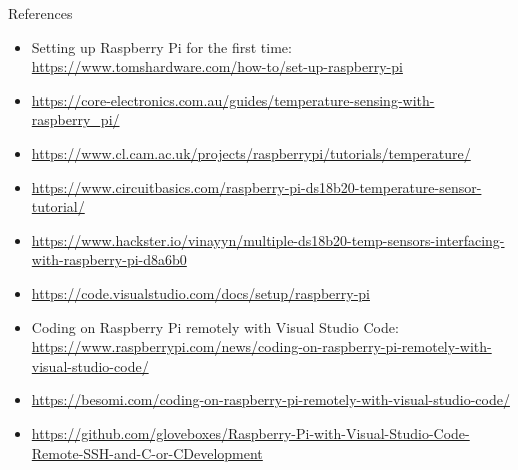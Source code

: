 \begin{labsection}{References}
  \begin{itemize}
    \item Setting up Raspberry Pi for the first time: \url{https://www.tomshardware.com/how-to/set-up-raspberry-pi}
    \item \url{https://core-electronics.com.au/guides/temperature-sensing-with-raspberry_pi/}
    \item \url{https://www.cl.cam.ac.uk/projects/raspberrypi/tutorials/temperature/}
    \item \url{https://www.circuitbasics.com/raspberry-pi-ds18b20-temperature-sensor-tutorial/}
    \item \url{https://www.hackster.io/vinayyn/multiple-ds18b20-temp-sensors-interfacing-with-raspberry-pi-d8a6b0}
    \item \url{https://code.visualstudio.com/docs/setup/raspberry-pi}
    \item Coding on Raspberry Pi remotely with Visual Studio Code: \url{https://www.raspberrypi.com/news/coding-on-raspberry-pi-remotely-with-visual-studio-code/}
    \item \url{https://besomi.com/coding-on-raspberry-pi-remotely-with-visual-studio-code/}
    \item \url{https://github.com/gloveboxes/Raspberry-Pi-with-Visual-Studio-Code-Remote-SSH-and-C-or-CDevelopment}
  \end{itemize}
\end{labsection}
